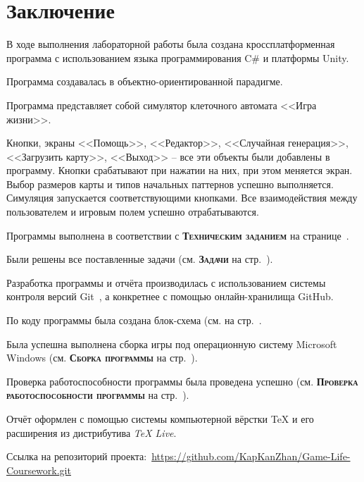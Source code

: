 \documentclass[14pt, oneside]{altsu-report}
\begin{document}



\chapter*{Заключение}
В ходе выполнения лабораторной работы была создана кроссплатформенная программа с использованием языка программирования C\# и платформы Unity.

Программа создавалась в объектно-ориентированной парадигме.

Программа представляет собой симулятор клеточного автомата <<Игра жизни>>.

Кнопки, экраны <<Помощь>>, <<Редактор>>, <<Случайная генерация>>, <<Загрузить карту>>, <<Выход>> – все эти объекты были добавлены в программу. Кнопки срабатывают при нажатии на них, при этом меняется экран. Выбор размеров карты и типов начальных паттернов успешно выполняется. Симуляция запускается соответствующими кнопками. Все взаимодействия между пользователем и игровым полем успешно отрабатываются.

Программы выполнена в соответствии с \textbf{\textsc{Техническим заданием}} на странице~\pageref{sec:ch01/sec01}.

Были решены все поставленные задачи (см. \textbf{\textsc{Задачи}} на стр.~\pageref{zadachi}).

Разработка программы и отчёта производилась с использованием системы контроля версий Git~\cite{git}, а конкретнее с помощью онлайн-хранилища GitHub.

По коду программы была создана блок-схема (см. на стр.~\pageref{fig5}.

Была успешна выполнена сборка игры под операционную систему Microsoft Windows (см. \textbf{\textsc{Сборка программы}} на стр.~\pageref{sec:ch02/sec01/sub05}).

Проверка работоспособности программы была проведена успешно (см. \textbf{\textsc{Проверка работоспособности программы}} на стр.~\pageref{sec:ch02/sec01/sub6}).

Отчёт оформлен с помощью системы компьютерной вёрстки \TeX{} и его расширения \XeTeX{} из дистрибутива \textit{TeX Live}.

Ссылка на репозиторий проекта:~\textcolor{blue}{\url{https://github.com/KapKanZhan/Game-Life-Coursework.git}}
\end{document}
